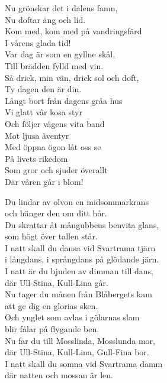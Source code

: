 \documentclass[a6paper,10pt]{article}
\begin{document}
\setlength{\oddsidemargin}{-0.47in}
\noindent
\begin{center}
\end{center}
\begin{lyrics}
Nu grönskar det i dalens famn,\\
Nu doftar äng och lid.\\
Kom med, kom med på vandringsfärd\\
I vårens glada tid!\\
Var dag är som en gyllne skål,\\
Till brädden fylld med vin.\\
Så drick, min vän, drick sol och doft,\\
Ty dagen den är din.
\vspace{5pt}\\
Långt bort från dagens gråa hus\\
Vi glatt vår kosa styr\\
Och följer vägens vita band\\
Mot ljusa äventyr\\
Med öppna ögon låt oss se\\
På livets rikedom\\
Som gror och sjuder överallt\\
Där våren går i blom! 
\end{lyrics}

\setlength{\oddsidemargin}{-0.37in}
\noindent
\begin{center}
\end{center}
\begin{lyrics}
Du lindar av olvon en midsommarkrans\\
och hänger den om ditt hår.\\
Du skrattar åt mångubbens benvita glans,\\
som högt över tallen står.\\
I natt skall du dansa vid Svartrama tjärn\\
i långdans, i språngdans på glödande järn.\\
I natt är du bjuden av dimman till dans,\\
där Ull-Stina, Kull-Lina går.
\vspace{5pt}\\
Nu tager du månen från Blåbergets kam\\
att ge dig en glorias sken.\\
Och ynglet som avlas i gölarnas slam\\
blir fålar på flygande ben.\\
Nu far du till Mosslinda, Mosslunda mor,\\
där Ull-Stina, Kull-Lina, Gull-Fina bor.\\
I natt skall du somna vid Svartrama damm\\
där natten och mossan är len.
\end{lyrics}
\end{document}

